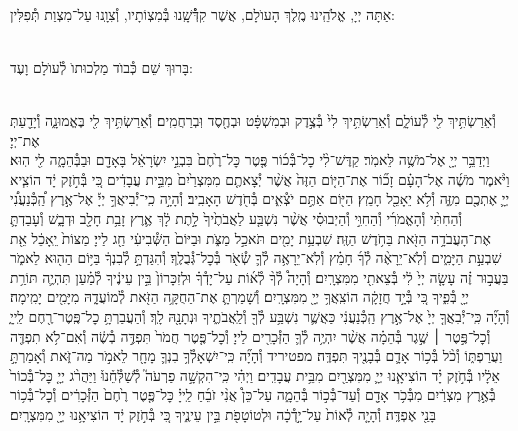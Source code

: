 \documentclass[twoside, openany, parskip=half, 11pt]{book}
\begin{document}
\\
אַתָּה יְיָ, אֱלֹהֵֽינוּ מֶֽלֶךְ הָעוֺלָם, אֲשֶׁר קִדְּ֯֯שָֽׁנוּ בְּ֯מִצְוֹתָיו, וְ֯צִוָֽנוּ עַל־מִצְוַת תְּ֯פִלִּין:

\\
בָּרוּךְ שֵׁם כְּ֯בוֺד מַלְכוּתוֺ לְ֯עוֺלָם וָעֶד:


\\
וְ֯אֵרַשְׂתִּ֥יךְ לִ֖י לְ֯עוֹלָ֑ם וְ֯אֵרַשְׂתִּ֥יךְ לִי֙ בְּ֯צֶ֣דֶק וּבְמִשְׁפָּ֔ט וּבְחֶ֖סֶד וּֽבְרַחֲמִֽים׃ וְ֯אֵרַשְׂתִּ֥יךְ לִ֖י בֶּאֱמוּנָ֑ה וְ֯יָדַ֖עַתְּ אֶת־יְיָ׃\\
וַיְדַבֵּ֥ר יְיָ֖ אֶל־מֹשֶׁ֥ה לֵּאמֹֽר׃ קַדֶּשׁ־לִ֨י כׇל־בְּ֯כ֜וֹר פֶּ֤טֶר כׇּל־רֶ֙חֶם֙ בִּבְנֵ֣י יִשְׂרָאֵ֔ל בָּאָדָ֖ם וּבַבְּ֯הֵמָ֑ה לִ֖י הֽוּא׃ וַיֹּ֨אמֶר מֹשֶׁ֜ה אֶל־הָעָ֗ם זָכ֞וֹר אֶת־הַיּ֤וֹם הַזֶּה֙ אֲשֶׁ֨ר יְ֯צָאתֶ֤ם מִמִּצְרַ֙יִם֙ מִבֵּ֣ית עֲבָדִ֔ים כִּ֚י בְּ֯חֹ֣זֶק יָ֔ד הוֹצִ֧יא יְיָ֛ אֶתְכֶ֖ם מִזֶּ֑ה וְ֯לֹ֥א יֵאָכֵ֖ל חָמֵֽץ׃ הַיּ֖וֹם אַתֶּ֣ם יֹצְ֯אִ֑ים בְּ֯חֹ֖דֶשׁ הָאָבִֽיב׃ וְ֯הָיָ֣ה כִֽי־יְ֯בִיאֲךָ֣ יְיָ֡ אֶל־אֶ֣רֶץ הַֽ֠כְּ֯נַעֲנִ֠י וְ֯הַחִתִּ֨י וְ֯הָאֱמֹרִ֜י וְ֯הַחִוִּ֣י וְ֯הַיְבוּסִ֗י אֲשֶׁ֨ר נִשְׁבַּ֤ע לַאֲבֹתֶ֙יךָ֙ לָ֣תֶת לָ֔ךְ אֶ֛רֶץ זָבַ֥ת חָלָ֖ב וּדְבָ֑שׁ וְ֯עָבַדְתָּ֛ אֶת־הָעֲבֹדָ֥ה הַזֹּ֖את בַּחֹ֥דֶשׁ הַזֶּֽה׃ שִׁבְעַ֥ת יָמִ֖ים תֹּאכַ֣ל מַצֹּ֑ת וּבַיּוֹם֙ הַשְּׁ֯בִיעִ֔י חַ֖ג לַייָ׃ מַצּוֹת֙ יֵֽאָכֵ֔ל אֵ֖ת שִׁבְעַ֣ת הַיָּמִ֑ים וְ֯לֹֽא־יֵרָאֶ֨ה לְ֯ךָ֜ חָמֵ֗ץ וְ֯לֹֽא־יֵרָאֶ֥ה לְ֯ךָ֛ שְׂ֯אֹ֖ר בְּ֯כׇל־גְּ֯בֻלֶֽךָ׃ וְ֯הִגַּדְתָּ֣ לְ֯בִנְךָ֔ בַּיּ֥וֹם הַה֖וּא לֵאמֹ֑ר בַּעֲב֣וּר זֶ֗ה עָשָׂ֤ה יְיָ֙ לִ֔י בְּ֯צֵאתִ֖י מִמִּצְרָֽיִם׃ וְ֯הָיָה֩ לְ֯ךָ֨ לְ֯א֜וֹת עַל־יָדְ֯ךָ֗ וּלְזִכָּרוֹן֙ בֵּ֣ין עֵינֶ֔יךָ לְ֯מַ֗עַן תִּהְיֶ֛ה תּוֹרַ֥ת יְיָ֖ בְּ֯פִ֑יךָ כִּ֚י בְּ֯יָ֣ד חֲזָקָ֔ה הוֹצִֽאֲךָ֥ יְיָ֖ מִמִּצְרָֽיִם׃ וְ֯שָׁמַרְתָּ֛ אֶת־הַחֻקָּ֥ה הַזֹּ֖את לְ֯מוֹעֲדָ֑הּ מִיָּמִ֖ים יָמִֽימָה׃\\

וְ֯הָיָ֞ה כִּֽי־יְ֯בִאֲךָ֤ יְיָ֙ אֶל־אֶ֣רֶץ הַֽכְּ֯נַעֲנִ֔י כַּאֲשֶׁ֛ר נִשְׁבַּ֥ע לְ֯ךָ֖ וְ֯לַֽאֲבֹתֶ֑יךָ וּנְתָנָ֖הּ לָֽךְ׃ וְ֯הַעֲבַרְתָּ֥ כׇל־פֶּֽטֶר־רֶ֖חֶם לַֽייָ֑ וְ֯כׇל־פֶּ֣טֶר ׀ שֶׁ֣גֶר בְּ֯הֵמָ֗ה אֲשֶׁ֨ר יִהְיֶ֥ה לְ֯ךָ֛ הַזְּ֯כָרִ֖ים לַייָ׃ וְ֯כׇל־פֶּ֤טֶר חֲמֹר֙ תִּפְדֶּ֣ה בְ֯שֶׂ֔ה וְ֯אִם־לֹ֥א תִפְדֶּ֖ה וַעֲרַפְתּ֑וֹ וְ֯כֹ֨ל בְּ֯כ֥וֹר אָדָ֛ם בְּ֯בָנֶ֖יךָ תִּפְדֶּֽה׃ מפטיריד וְ֯הָיָ֞ה כִּֽי־יִשְׁאָלְ֯ךָ֥ בִנְךָ֛ מָחָ֖ר לֵאמֹ֣ר מַה־זֹּ֑את וְ֯אָמַרְתָּ֣ אֵלָ֔יו בְּ֯חֹ֣זֶק יָ֗ד הוֹצִיאָ֧נוּ יְיָ֛ מִמִּצְרַ֖יִם מִבֵּ֥ית עֲבָדִֽים׃ וַיְהִ֗י כִּֽי־הִקְשָׁ֣ה פַרְעֹה֮ לְ֯שַׁלְּ֯חֵ֒נוּ֒ וַיַּהֲרֹ֨ג יְיָ֤ כׇּל־בְּ֯כוֹר֙ בְּ֯אֶ֣רֶץ מִצְרַ֔יִם מִבְּ֯כֹ֥ר אָדָ֖ם וְ֯עַד־בְּ֯כ֣וֹר בְּ֯הֵמָ֑ה עַל־כֵּן֩ אֲנִ֨י זֹבֵ֜חַ לַֽייָ֗ כׇּל־פֶּ֤טֶר רֶ֙חֶם֙ הַזְּ֯כָרִ֔ים וְ֯כׇל־בְּ֯כ֥וֹר בָּנַ֖י אֶפְדֶּֽה׃ וְ֯הָיָ֤ה לְ֯אוֹת֙ עַל־יָ֣דְ֯כָ֔ה וּלְטוֹטָפֹ֖ת בֵּ֣ין עֵינֶ֑יךָ כִּ֚י בְּ֯חֹ֣זֶק יָ֔ד הוֹצִיאָ֥נוּ יְיָ֖ מִמִּצְרָֽיִם׃
\end{document}
